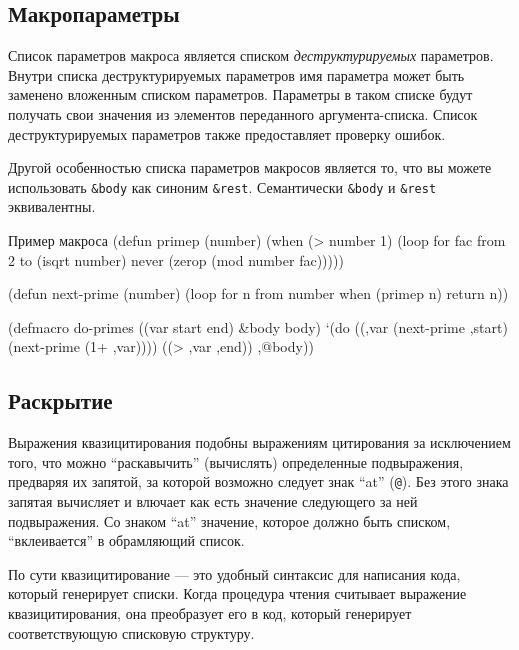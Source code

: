 \subsection{Макропараметры}
Список параметров макроса является списком \emph{деструктурируемых} параметров. Внутри списка деструктурируемых параметров имя параметра может быть заменено вложенным списком параметров. Параметры в таком списке будут получать свои значения из элементов переданного аргумента-списка. Список деструктурируемых параметров также предоставляет проверку ошибок.

Другой особенностью списка параметров макросов является то, что вы можете использовать \lstinline{&body} как синоним \lstinline{&rest}. Семантически \lstinline{&body} и \lstinline{&rest} эквивалентны.
\begin{cllst}{Пример макроса}{}
(defun primep (number)
  (when (> number 1)
    (loop for fac from 2 to (isqrt number) never (zerop (mod number fac)))))
 
(defun next-prime (number)
  (loop for n from number when (primep n) return n))

(defmacro do-primes ((var start end) &body body)
  `(do ((,var (next-prime ,start) (next-prime (1+ ,var))))
       ((> ,var ,end))
     ,@body))
\end{cllst}

\subsection{Раскрытие}
Выражения квазицитирования подобны выражениям цитирования за исключением того, что можно ``раскавычить'' (вычислять) определенные подвыражения, предваряя их запятой, за которой возможно следует знак ``at'' (\lstinline{@}). Без этого знака запятая вычисляет и влючает как есть значение следующего за ней подвыражения. Со знаком ``at'' значение, которое должно быть списком, ``вклеивается'' в обрамляющий список.

По сути квазицитирование — это удобный синтаксис для написания кода, который генерирует списки. Когда процедура чтения считывает выражение квазицитирования, она преобразует его в код, который генерирует соответствующую списковую структуру.

